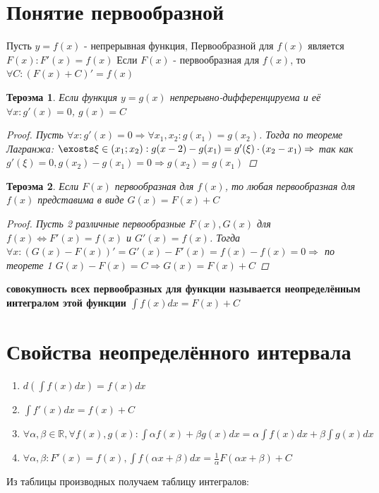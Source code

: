 \documentclass[oneside]{book}
\newtheorem{thm}{Тероэма}[chapter] %
\begin{document}
\begin{enumerate}
\begin{itemize}
\begin{enumerate}
\section[Первообразная]{Понятие первообразной}
Пусть $y = f(x)$ - непрерывная функция, Первообразной для $f(x)$ является $F(x): F'(x) = f(x)$
Если $F(x)$ - первообразная для $f(x)$, то $\forall C: (F(x) + C)' = f(x)$
\begin{thm}
  Если функция $y = g(x)$ непрерывно-дифференцируема и её $\forall x: g'(x) = 0$, $g(x) = C$
  \begin{proof}
    Пусть $\forall x: g'(x) = 0 \Rightarrow \forall x_1, x_2: g(x_1) = g(x_2)$. Тогда по теореме Лагранжа:
    $\exosts \xi \in (x_1; x_2): g(x-2) - g(x_1) = g'(\xi)\cdot(x_2 - x_1) \Rightarrow$ так как $g'(\xi) = 0, g(x_2) - g(x_1) = 0 \Rightarrow g(x_2) = g(x_1)$
  \end{proof}
\end{thm}
\begin{thm}
  Если $F(x)$ первообразная для $f(x)$, то любая первообразная для $f(x)$ представима в виде $G(x) = F(x) + C$
  \begin{proof}
    Пусть 2 различные первообразные $F(x), G(x)$ для $f(x) \Leftrightarrow F'(x) = f(x) $ и $G'(x) = f(x)$.
    Тогда $\forall x: (G(x) - F(x))' = G'(x) - F'(x) = f(x) - f(x) = 0 \Rightarrow$ по теорете 1 $G(x) - F(x) = C \Rightarrow G(x) = F(x) + C$
  \end{proof}
\end{thm}
\textbf{совокупность всех первообразных для функции называется неопределённым интегралом этой функции $\int f(x) dx = F(x) + C$}
\section[Свойства]{Свойства неопределённого интервала}
\begin{enumerate}
  \item $d(\int f(x) dx) = f(x) dx$
  \item $\int f'(x) dx = f(x) + C$
  \item $\forall \alpha, \beta \in \mathbb{R}, \forall f(x), g(x): \int \alpha f(x) + \beta g(x) dx = \alpha \int f(x) dx + \beta \int g(x) dx$
  \item $\forall \alpha, \beta: F'(x) = f(x), \int f(\alpha x + \beta) dx = \frac{1}{\alpha}F(\alpha x+\beta)+C$
\end{enumerate}
Из таблицы производных получаем таблицу интегралов:


\end{enumerate}
\end{itemize}
\end{enumerate}
\end{document}
